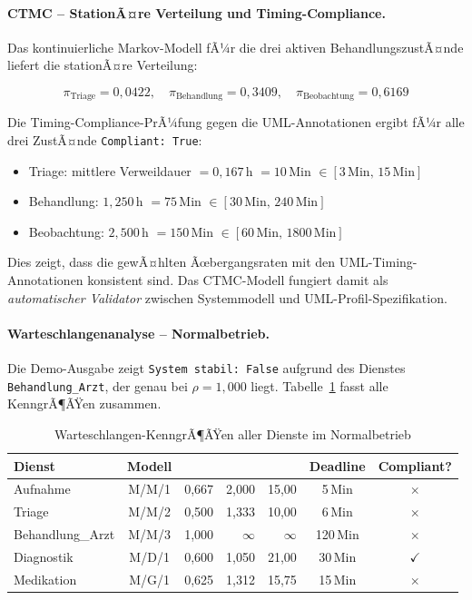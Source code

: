 ﻿\documentclass[a4paper,12pt]{report}
\theoremstyle{definition}
\begin{document}
\paragraph{CTMC -- StationÃ¤re Verteilung und Timing-Compliance.}
Das kontinuierliche Markov-Modell fÃ¼r die drei aktiven BehandlungszustÃ¤nde
liefert die stationÃ¤re Verteilung:

\begin{equation}
	\pi_\text{Triage} = 0{,}0422, \quad
	\pi_\text{Behandlung} = 0{,}3409, \quad
	\pi_\text{Beobachtung} = 0{,}6169
\end{equation}

Die Timing-Compliance-PrÃ¼fung gegen die UML-Annotationen ergibt
fÃ¼r alle drei ZustÃ¤nde \texttt{Compliant: True}:
\begin{itemize}
	\item[-] Triage: mittlere Verweildauer $= 0{,}167$\,h $= 10$\,Min
	$\in [3\,\text{Min},\, 15\,\text{Min}]$ \checkmark
	\item[-] Behandlung: $1{,}250$\,h $= 75$\,Min
	$\in [30\,\text{Min},\, 240\,\text{Min}]$ \checkmark
	\item[-] Beobachtung: $2{,}500$\,h $= 150$\,Min
	$\in [60\,\text{Min},\, 1800\,\text{Min}]$ \checkmark
\end{itemize}

Dies zeigt, dass die gewÃ¤hlten Ãœbergangsraten mit den UML-Timing-Annotationen
konsistent sind. Das CTMC-Modell fungiert damit als \emph{automatischer
	Validator} zwischen Systemmodell und UML-Profil-Spezifikation.

\paragraph{Warteschlangenanalyse -- Normalbetrieb.}
Die Demo-Ausgabe zeigt \texttt{System \newline stabil: False} aufgrund des
Dienstes \texttt{Behandlung\_Arzt}, der genau bei $\rho = 1{,}000$ liegt.
Tabelle~\ref{tab:wq-auswertung-normal} fasst alle KenngrÃ¶ÃŸen zusammen.

\begin{table}[H]
	\centering
	\begin{tabular}{@{}lcrrrcc@{}}
		\toprule
		\textbf{Dienst} & \textbf{Modell} & \boldmath{$\rho$} &
		\boldmath{$L$} & \boldmath{$W$ (Min)} & \textbf{Deadline} & \textbf{Compliant?} \\
		\midrule
		Aufnahme        & M/M/1 & 0{,}667 & 2{,}000 &  15{,}00 & 5\,Min   & $\times$ \\
		Triage          & M/M/2 & 0{,}500 & 1{,}333 &  10{,}00 & 6\,Min   & $\times$ \\
		Behandlung\_Arzt& M/M/3 & 1{,}000 & $\infty$& $\infty$ & 120\,Min & $\times$ \\
		Diagnostik      & M/D/1 & 0{,}600 & 1{,}050 &  21{,}00 & 30\,Min  & $\checkmark$ \\
		Medikation      & M/G/1 & 0{,}625 & 1{,}312 &  15{,}75 & 15\,Min  & $\times$ \\
		\bottomrule
	\end{tabular}
	\caption{Warteschlangen-KenngrÃ¶ÃŸen aller Dienste im Normalbetrieb}
\label{tab:queue-alle-dienste}
	\label{tab:wq-auswertung-normal}
\end{table}
\end{document}
